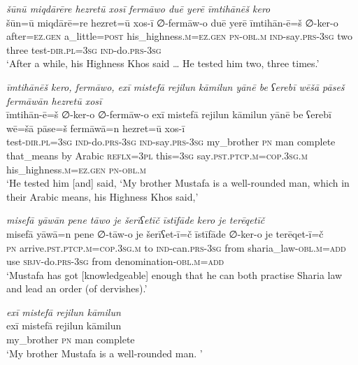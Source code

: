\ea \label{ŽP.82}
\textit{šūnū miqdārēre hezretū xosī fermāwo duē yerē īmtihānēš kero} \\ 
\gll šūn=ū miqdārē=re hezret=ū xos-ī ∅-fermāw-o duē yerē īmtihān-ē=š ∅-ker-o \\ 
 after\textsc{\textsc{=ez.gen}} a\_little\textsc{=\textsc{post}} his\_highness\textsc{.m}\textsc{\textsc{=ez.gen}} \textsc{pn}\textsc{-obl}\textsc{.m} \textsc{ind-}say\textsc{.prs}\textsc{-3sg} two three test\textsc{-dir}\textsc{.pl}\textsc{=3sg} \textsc{ind-}do\textsc{.prs}\textsc{-3sg} \\ 
\glt `After a while, his Highness Khos said … He tested him two, three times.'
\z 
 
\ea \label{ŽP.83}
\textit{īmtihānēš kero, fermāwo, exī mistefā rejilun kāmilun yānē be ʕerebī wēšā pāseš fermāwān hezretū xosī} \\ 
\gll īmtihān-ē=š ∅-ker-o ∅-fermāw-o exī mistefā rejilun kāmilun yānē be ʕerebī wē=šā pāse=š fermāwā=n hezret=ū xos-ī \\ 
 test\textsc{-dir}\textsc{.pl}\textsc{=3sg} \textsc{ind-}do\textsc{.prs}\textsc{-3sg} \textsc{ind-}say\textsc{.prs}\textsc{-3sg} my\_brother \textsc{pn} man complete that\_means by Arabic \textsc{reflx}\textsc{=3pl} this\textsc{=3sg} say\textsc{.pst}\textsc{.ptcp}\textsc{.m}\textsc{=cop}\textsc{.3sg}\textsc{.m} his\_highness\textsc{.m}\textsc{\textsc{=ez.gen}} \textsc{pn}\textsc{-obl}\textsc{.m} \\ 
\glt `He tested him [and] said, ‘My brother Mustafa is a well-rounded man, which in their Arabic means, his Highness Khos said,'
\z 
 
\ea \label{ŽP.84}
\textit{misefā yāwān pene tāwo je šerīʕetīč īstīfāde kero je terēqetīč} \\ 
\gll misefā yāwā=n pene ∅-tāw-o je šerīʕet-ī=č īstīfāde ∅-ker-o je terēqet-ī=č \\ 
 \textsc{pn} arrive\textsc{.pst}\textsc{.ptcp}\textsc{.m}\textsc{=cop}\textsc{.3sg}\textsc{.m} to \textsc{ind-}can\textsc{.prs}\textsc{-3sg} from sharia\_law\textsc{-obl}\textsc{.m}\textsc{=add} use \textsc{sbjv-}do\textsc{.prs}\textsc{-3sg} from denomination\textsc{-obl}\textsc{.m}\textsc{=add} \\ 
\glt `Mustafa has got [knowledgeable] enough that he can both practise Sharia law and lead an order (of dervishes).'
\z 
 
\ea \label{ŽP.86}
\textit{exī mistefā rejilun kāmilun} \\ 
\gll exī mistefā rejilun kāmilun \\ 
 my\_brother \textsc{pn} man complete \\ 
\glt `My brother Mustafa is a well-rounded man. '
\z 
 
